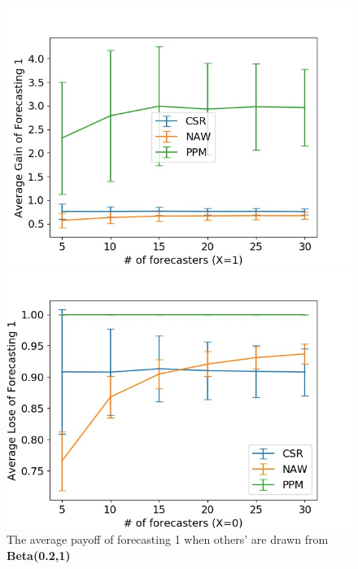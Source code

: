 \documentclass[english,10pt]{article}
\begin{document}
\begin{enumerate}
	\begin{figure}[H]
        	\centering
        	\begin{minipage}{0.48\textwidth}
        	\includegraphics[width = \textwidth]{Ind(Beta(0dot2_1)F_UnifW)Avg_gain_of_forecasting_1.jpg}
        	\end{minipage}
        	\begin{minipage}{0.48\textwidth}
        	\includegraphics[width = \textwidth]{Ind(Beta(0dot2_1)F_UnifW)Avg_lose_of_forecasting_1.jpg}
        	\end{minipage}
        	\caption{The  average payoff of forecasting 1 when others' are drawn from \textbf{Beta(0.2,1)}}
        	\end{figure}
	

\end{enumerate}
\end{document}
